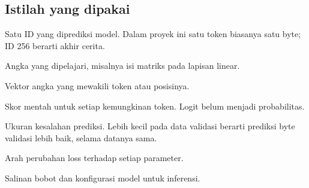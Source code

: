 \documentclass[11pt,a4paper]{article}
\begin{document}
\subsection{Istilah yang dipakai}
\begin{description}[leftmargin=35mm,style=nextline]
\item[Token] Satu ID yang diprediksi model. Dalam proyek ini satu token
biasanya satu byte; ID 256 berarti akhir cerita.
\item[Parameter/bobot] Angka yang dipelajari, misalnya isi matriks pada
lapisan linear.
\item[Embedding] Vektor angka yang mewakili token atau posisinya.
\item[Logit] Skor mentah untuk setiap kemungkinan token. Logit belum menjadi
probabilitas.
\item[Loss] Ukuran kesalahan prediksi. Lebih kecil pada data validasi berarti
prediksi byte validasi lebih baik, selama datanya sama.
\item[Gradien] Arah perubahan loss terhadap setiap parameter.
\item[Checkpoint] Salinan bobot dan konfigurasi model untuk inferensi.
\end{description}
\end{document}

